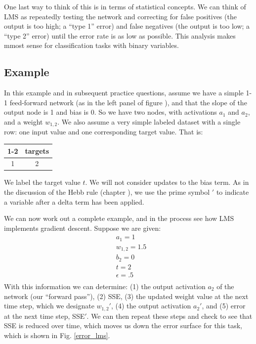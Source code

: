 One last way to think of this is in terms of statistical concepts. We can think of LMS as repeatedly testing the network and correcting for false positives (the output is too high; a ``type 1'' error) and false negatives (the output is too low; a ``type 2'' error) until the error rate is as low as possible. This analysis makes mmost sense for classification tasks with binary variables.
 
\subsection{Example}\label{lms_example}

In this example and in subsequent practice questions, assume we have a  simple 1-1 feed-forward network (as in the left panel of figure ), and that the slope of the output node is 1 and bias is 0. So we have two nodes, with activations $a_1$ and $a_2$, and a weight $w_{1,2}$. We also assume a very simple labeled dataset with a single row: one input value and one corresponding target value. That is:
\begin{center}
\begin{tabular}{| c || c | }
\cline{1-2}
\multicolumn{1}{| c || }{inputs}
 & \multicolumn{1}{c|}{targets} \\
\hline
  1 & 2  \\
\hline
\end{tabular}
\end{center}
We label the target value $t$. We will not consider updates to the bias term. As in the discussion of the Hebb rule (chapter ), we use the prime symbol $'$ to indicate a variable after a delta term has been applied.

We can now work out a complete example, and in the process see how LMS implements gradient descent. Suppose we are given:
\begin{eqnarray*}
& a_1 = 1 \\
& w_{1,2} = 1.5 \\
& b_2 = 0 \\
& t = 2  \\
& \epsilon = .5  \\
\end{eqnarray*}
With this information we can determine: (1) the output activation $a_2$ of the network (our ``forward pass''), (2) SSE, (3) the updated weight value at the next time step, which we designate $w_{1,2}'$, (4) the output activation $a_2'$, and (5) error at the next time step, SSE$'$. We can then repeat these steps and check to see that SSE is reduced over time, which moves us down the error surface for this task, which is shown in Fig. \ref{error_lms}.


